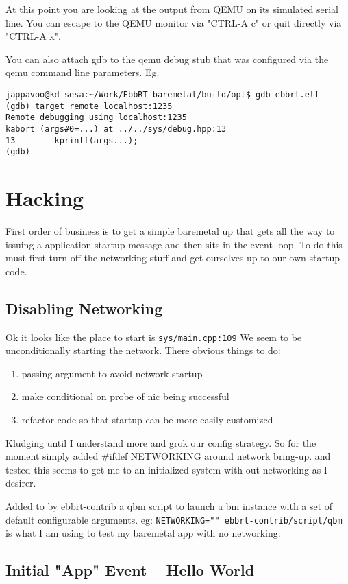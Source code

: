 \documentclass[11pt]{report}
\begin{document}
At this point you are looking at the output from QEMU on its simulated serial line.  You can escape to the QEMU monitor via "CTRL-A c" or quit directly via "CTRL-A x".  

You can also attach gdb to the qemu debug stub that was configured via the qemu command line parameters.
Eg.
\begin{verbatim}
jappavoo@kd-sesa:~/Work/EbbRT-baremetal/build/opt$ gdb ebbrt.elf
(gdb) target remote localhost:1235
Remote debugging using localhost:1235
kabort (args#0=...) at ../../sys/debug.hpp:13
13        kprintf(args...);
(gdb) 
\end{verbatim}

\chapter{Hacking}

First order of business is to get a simple baremetal
up that gets all the way to issuing a application
startup message and then sits in the event loop.
To do this must first turn off the networking stuff
and get ourselves up to our own startup code.

\section{Disabling Networking}

Ok it looks like the place to start is {\tt sys/main.cpp:109}
We seem to be unconditionally starting the network. 
There obvious things to do:
\begin{enumerate}
\item passing argument to avoid network startup
\item make conditional on probe of nic being successful
\item refactor code so that startup can be more easily customized
\end{enumerate}
Kludging until I understand more and grok our config strategy.
So for the moment simply added \#ifdef NETWORKING around network bring-up.
and tested this seems to get me to an initialized system with out networking
as I desirer.   

Added  to by ebbrt-contrib a qbm script to launch a bm instance with
a set of default configurable arguments. eg:
{\tt NETWORKING="" ebbrt-contrib/script/qbm} is what I am using to test 
my baremetal app with no networking.

\section{Initial "App" Event -- Hello World}
\end{document}
